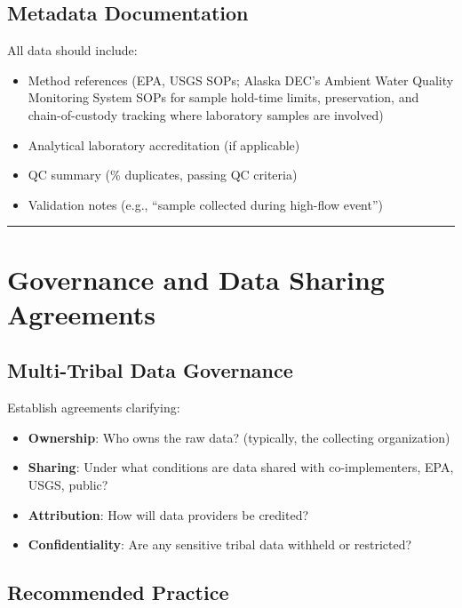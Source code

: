 \documentclass[
  letterpaper,
]{scrbook}
\providecommand{\tightlist}{%
  \setlength{\itemsep}{0pt}\setlength{\parskip}{0pt}}\usepackage{longtable,booktabs,array}
\begin{document}
\subsection{Metadata Documentation}\label{metadata-documentation}

All data should include:

\begin{itemize}
\tightlist
\item
  Method references (EPA, USGS SOPs; Alaska DEC's Ambient Water Quality
  Monitoring System SOPs for sample hold-time limits, preservation, and
  chain-of-custody tracking where laboratory samples are involved)
\item
  Analytical laboratory accreditation (if applicable)
\item
  QC summary (\% duplicates, passing QC criteria)
\item
  Validation notes (e.g., ``sample collected during high-flow event'')
\end{itemize}

\begin{center}\rule{0.5\linewidth}{0.5pt}\end{center}

\section{Governance and Data Sharing
Agreements}\label{governance-and-data-sharing-agreements}

\subsection{Multi-Tribal Data
Governance}\label{multi-tribal-data-governance}

Establish agreements clarifying:

\begin{itemize}
\tightlist
\item
  \textbf{Ownership}: Who owns the raw data? (typically, the collecting
  organization)
\item
  \textbf{Sharing}: Under what conditions are data shared with
  co-implementers, EPA, USGS, public?
\item
  \textbf{Attribution}: How will data providers be credited?
\item
  \textbf{Confidentiality}: Are any sensitive tribal data withheld or
  restricted?
\end{itemize}

\subsection{Recommended Practice}\label{recommended-practice}
\end{document}
